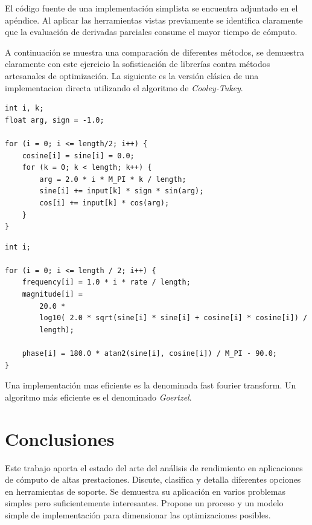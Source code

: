 \documentclass[a4paper]{report}
\begin{document}
\bigskip

El c\'odigo fuente de una implementaci\'on simplista se encuentra adjuntado en
el ap\'endice. Al aplicar las herramientas vistas previamente se identifica
claramente que la evaluaci\'on de derivadas parciales consume el mayor tiempo
de c\'omputo.

\bigskip

A continuaci\'on se muestra una comparaci\'on de diferentes m\'etodos, se
demuestra claramente con este ejercicio la sofisticaci\'on de librer\'ias
contra m\'etodos artesanales de optimizaci\'on. La siguiente es la versi\'on
cl\'asica de una implementacion directa utilizando el algoritmo de
{\it Cooley-Tukey}.

\begin{verbatim}
int i, k;
float arg, sign = -1.0;

for (i = 0; i <= length/2; i++) {
    cosine[i] = sine[i] = 0.0;
    for (k = 0; k < length; k++) {
        arg = 2.0 * i * M_PI * k / length;
        sine[i] += input[k] * sign * sin(arg);
        cos[i] += input[k] * cos(arg);
    }
}
\end{verbatim}

\begin{verbatim}
int i;

for (i = 0; i <= length / 2; i++) {
    frequency[i] = 1.0 * i * rate / length;
    magnitude[i] =
        20.0 *
        log10( 2.0 * sqrt(sine[i] * sine[i] + cosine[i] * cosine[i]) /
        length);

    phase[i] = 180.0 * atan2(sine[i], cosine[i]) / M_PI - 90.0;
}
\end{verbatim}

Una implementaci\'on mas eficiente es la denominada fast fourier transform.
Un algoritmo m\'as eficiente es el denominado {\it Goertzel}.

\chapter{Conclusiones}

Este trabajo aporta el estado del arte del an\'alisis de rendimiento en
aplicaciones de c\'omputo de altas prestaciones. Discute, clasifica y detalla
diferentes opciones en herramientas de soporte. Se demuestra su aplicaci\'on
en varios problemas simples pero suficientemente interesantes. Propone un
proceso y un modelo simple de implementaci\'on para dimensionar las
optimizaciones posibles.

\bigskip
\end{document}
